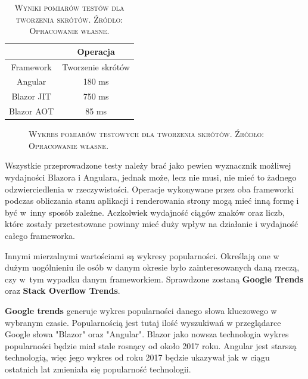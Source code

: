 \documentclass[12pt,a4paper,oneside]{book}
\newcommand{\captionT}[1]{\caption{\textsc{\footnotesize{#1}}}}
\begin{document}
\begin{table}[!htp]
\centering
\captionT{Wyniki pomiarów testów dla tworzenia skrótów. Źródło: Opracowanie własne.}
\begin{tabular}{ |c|c| }
 \hline
  & Operacja \\
 \hline
  Framework & Tworzenie skrótów \\
 \hline
Angular & 180 ms\\
Blazor JIT & 750 ms\\
Blazor AOT & 85 ms\\

 \hline
\end{tabular}
\label{tab_wyniki_skroty}
\end{table}

\begin{figure}[!htp]
\centering
{}
\captionT{Wykres pomiarów testowych dla tworzenia skrótów. Źródło: Opracowanie własne.}
\label{wykres_wyniki_skroty}
\end{figure}

Wszystkie przeprowadzone testy należy brać jako pewien wyznacznik możliwej wydajności Blazora i Angulara, jednak może, lecz nie musi, nie mieć to żadnego odzwierciedlenia w rzeczywistości. Operacje wykonywane przez oba frameworki podczas obliczania stanu aplikacji i renderowania strony mogą mieć inną formę i być w~inny sposób zależne. Aczkolwiek wydajność ciągów znaków oraz liczb, które zostały przetestowane powinny mieć duży wpływ na działanie i wydajność całego frameworka.

Innymi mierzalnymi wartościami są wykresy popularności. Określają one w dużym uogólnieniu ile osób w danym okresie było zainteresowanych daną rzeczą, czy w~tym wypadku danym frameworkiem. Sprawdzone zostaną \textbf{Google Trends} oraz \textbf{Stack Overflow Trends}.

\textbf{Google trends} generuje wykres popularności danego słowa kluczowego w wybranym czasie. Popularnością jest tutaj ilość wyszukiwań w przeglądarce Google słowa "Blazor" oraz "Angular". Blazor jako nowsza technologia wykres popularności będzie miał stale rosnący od około 2017 roku. Angular jest starszą technologią, więc jego wykres od roku 2017 będzie ukazywał jak w ciągu ostatnich lat zmieniała się popularność technologii.
\end{document}
